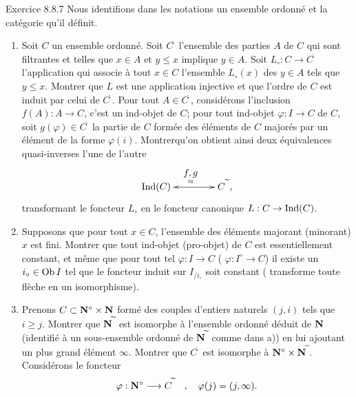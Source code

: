 \documentclass[10pt]{../fichiers-configuration-latex/smfart}
\def\labelenumi{(\theenumi)}
\begin{document}
\begin{enonce*}[remark]{Exercice 8.8.7}
Nous identifions dans les notations un ensemble ordonné et la
catégorie qu'il définit.
\begin{enumerate}
\renewcommand{\theenumi}{\alph{enumi}}
\renewcommand{\labelenumi}{\theenumi)}
\item Soit $C$ un ensemble ordonné. Soit $C^{\widetilde{\phantom{,}}}$
l'ensemble des parties $A$ de $C$ qui sont filtrantes et telles que
$x\in A$ et $y\leq x$ implique $y\in A$. Soit $L_\circ:C\rightarrow
C^{\widetilde{\phantom{,}}}$ l'application qui associe à tout $x\in
C$ l'ensemble $L_\circ(x)$ des $y\in A$ tels que $y\leq x$. Montrer
que $L$ est une application injective et que l'ordre de $C$ est
induit par celui de $C^{\widetilde{\phantom{,}}}$. Pour tout $A\in
C^{\widetilde{\phantom{,}}}$, considérons l'inclusion
$f(A):A\rightarrow C$, %
c'est un ind-objet de $C$; pour tout ind-objet $\varphi:I\rightarrow
C$ de $C$, soit $g(\varphi)\in C^{\widetilde{\phantom{,}}}$ la
partie de $C$ formée des éléments de $C$ majorés par un élément de
la forme $\varphi(i)$. Montrer\pageoriginale qu'on obtient ainsi
deux équivalences quasi-inverses l'une de l'autre
\[
\xymatrix@C=1.5cm{ \Ind(C)
\ar@{<->}[r]^(.5){\displaystyle\mathop{f,g}_{\approx}}&
C^{\widetilde{\phantom{a}}}, }
\]
transformant le foncteur $L_\circ$ en le foncteur canonique
$L:C\rightarrow \operatorname{Ind}(C)$.

\item Supposons que pour tout $x\in C$, l'ensemble des éléments
majorant (\resp minorant) $x$ est fini. Montrer que tout ind-objet
(\resp pro-objet) de $C$ est essentiellement constant, et même que
pour tout tel $\varphi:I\rightarrow C$ (\resp
$\varphi:I^\circ\rightarrow C$) il existe un $i_\circ\in \operatorname{Ob} I$ tel
que le foncteur induit sur $I_{/i_\circ}$ soit constant (\ie
transforme toute flèche en un isomorphisme).

\item Prenons $C\subset\mathbf{N}^\circ\times
\mathbf{N}$ formé des couples d'entiers naturels $(j,i)$ tels que $i\geq
j$. Montrer que $\mathbf{N}^{\widetilde{\phantom{,}}}$ est isomorphe à
l'ensemble ordonné déduit de $\mathbf{N}$ (identifié à un sous-ensemble
ordonné de $\mathbf{N}^{\widetilde{\phantom{,}}}$ comme dans a)) en lui
ajoutant un plus grand élément $\infty$. Montrer que
$C^{\widetilde{\phantom{,}}}$ est isomorphe à $\mathbf{N}^\circ\times
\mathbf{N}^{\widetilde{\phantom{,}}}$. Considérons le foncteur
$$
\varphi:\mathbf{N}^\circ\longrightarrow C^{\widetilde{\phantom{,}}}\quad,\quad
\varphi(j)=(j,\infty){}.
$$
\end{enumerate}
\end{enonce*}
\end{document}
